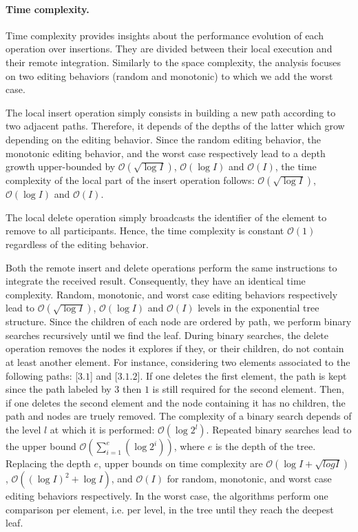 
\paragraph{Time complexity.}

Time complexity provides insights about the performance evolution of each
operation over insertions. They are divided between their local execution and
their remote integration.  Similarly to the space complexity, the analysis
focuses on two editing behaviors (random and monotonic) to which we add the
worst case.

The local insert operation simply consists in building a new path according to
two adjacent paths. Therefore, it depends of the depths of the latter which grow
depending on the editing behavior. Since the random editing behavior, the
monotonic editing behavior, and the worst case respectively lead to a depth
growth upper-bounded by $\mathcal{O}(\sqrt{\log I})$, $\mathcal{O}(\log I)$ and
$\mathcal{O}(I)$, the time complexity of the local part of the insert operation
follows: $\mathcal{O}(\sqrt{\log I})$, $\mathcal{O}(\log I)$ and
$\mathcal{O}(I)$.

The local delete operation simply broadcasts the identifier of the element to
remove to all participants. Hence, the time complexity is constant
$\mathcal{O}(1)$ regardless of the editing behavior.

Both the remote insert and delete operations perform the same instructions to
integrate the received result. Consequently, they have an identical time
complexity. Random, monotonic, and worst case editing behaviors respectively
lead to $\mathcal{O}(\sqrt{\log I})$, $\mathcal{O}(\log I)$ and $\mathcal{O}(I)$
levels in the exponential tree structure. Since the children of each node are
ordered by path, we perform binary searches recursively until we find the
leaf. During binary searches, the delete operation removes the nodes it explores
if they, or their children, do not contain at least another element. For
instance, considering two elements associated to the following paths: [$3.1$]
and [$3.1.2$]. If one deletes the first element, the path is kept since the path
labeled by $3$ then $1$ is still required for the second element. Then, if one
deletes the second element and the node containing it has no children, the path
and nodes are truely removed. The complexity of a binary search depends of the
level $l$ at which it is performed: $\mathcal{O}(\log 2^l)$. Repeated binary
searches lead to the upper bound
$\mathcal{O}(\textstyle\sum\nolimits_{i=1}^{e}(\log 2^i))$, where $e$ is the
depth of the tree. Replacing the depth $e$, upper bounds on time complexity are
$\mathcal{O}(\log I + \sqrt{log I})$, $\mathcal{O}((\log I)^2+\log I)$, and
$\mathcal{O}(I)$ for random, monotonic, and worst case editing behaviors
respectively. In the worst case, the algorithms perform one comparison per
element, i.e. per level, in the tree until they reach the deepest leaf.


